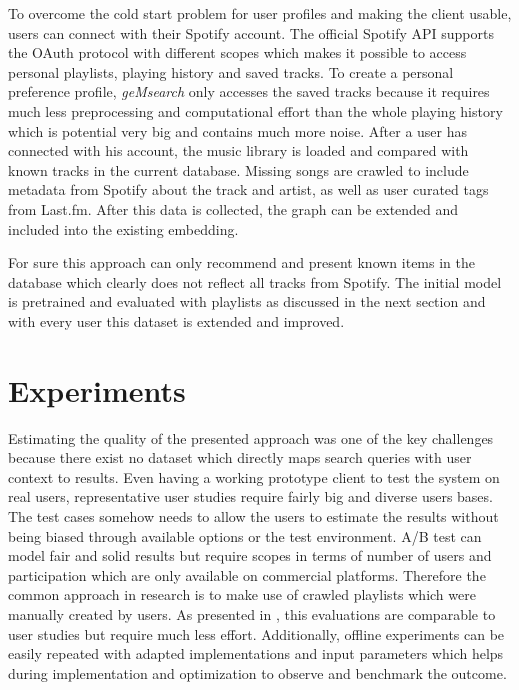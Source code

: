 \documentclass[a4paper]{llncs}
\begin{document}
	
	\label{sec:impl_spotify_connect}
	To overcome the cold start problem for user profiles and making the client usable, users can connect with their Spotify account. The official Spotify API supports the OAuth protocol with different scopes which makes it possible to access personal playlists, playing history and saved tracks. To create a personal preference profile, \emph{geMsearch} only accesses the saved tracks because it requires much less preprocessing and computational effort than the whole playing history which is potential very big and contains much more noise. After a user has connected with his account, the music library is loaded and compared with known tracks in the current database. Missing songs are crawled to include metadata from Spotify about the track and artist, as well as user curated tags from Last.fm. After this data is collected, the graph can be extended and included into the existing embedding.
	
	For sure this approach can only recommend and present known items in the database which clearly does not reflect all tracks from Spotify. The initial model is pretrained and evaluated with playlists as discussed in the next section and with every user this dataset is extended and improved.
	
	\section{Experiments}
	Estimating the quality of the presented approach was one of the key challenges because there exist no dataset which directly maps search queries with user context to results. Even having a working prototype client to test the system on real users, representative user studies require fairly big and diverse users bases. The test cases somehow needs to allow the users to estimate the results without being biased through available options or the test environment. A/B test can model fair and solid results but require scopes in terms of number of users and participation which are only available on commercial platforms. Therefore the common approach in research is to make use of crawled playlists which were manually created by users. As presented in \cite{kamehkhosh2017user}, this evaluations are comparable to user studies but require much less effort. Additionally, offline experiments can be easily repeated with adapted implementations and input parameters which helps during implementation and optimization to observe and benchmark the outcome. \\
	
\end{document}
